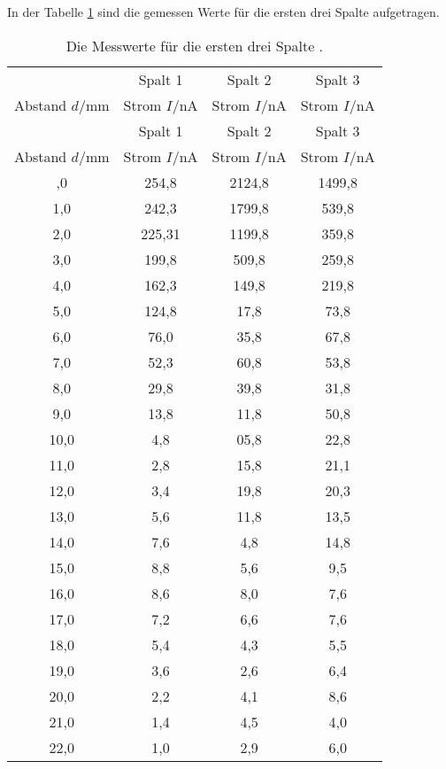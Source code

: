 In der Tabelle \ref{tab:spalt} sind die gemessen Werte
für die ersten drei Spalte aufgetragen.
\newpage
\begin{center}
\begin{longtable}{c c c c }
  \caption{Die Messwerte für die ersten drei Spalte .}
  \label{tab:spalt}\\
  \toprule
      & Spalt 1 & Spalt 2 & Spalt 3\\
  Abstand $d/\si{\milli\meter}$ & Strom $I/\si{\nano\ampere}$ & Strom $I/\si{\nano\ampere}$   & Strom $I/\si{\nano\ampere}$     \\
  \midrule
  \endfirsthead
  \toprule
  & Spalt 1 & Spalt 2 & Spalt 3\\
Abstand $d/\si{\milli\meter}$ & Strom $I/\si{\nano\ampere}$ & Strom $I/\si{\nano\ampere}$   & Strom $I/\si{\nano\ampere}$     \\
  \midrule
  \endhead
  \bottomrule
  \endfoot
  0,0 & 254,8  & 2124,8 & 1499,8\\
  1,0 & 242,3  & 1799,8 &  539,8\\
  2,0 & 225,31 & 1199,8 &  359,8\\
  3,0 & 199,8  &  509,8 &  259,8\\
  4,0 & 162,3  &  149,8 &  219,8\\
  5,0 & 124,8  &   17,8 &   73,8\\
  6,0 & 76,0   &   35,8 &   67,8\\
  7,0 & 52,3   &   60,8 &   53,8\\
  8,0 & 29,8   &   39,8 &   31,8\\
  9,0 & 13,8   &   11,8 &   50,8\\
  10,0 & 4,8   &   05,8 &   22,8\\
  11,0 & 2,8   &   15,8 &   21,1\\
  12,0 & 3,4   &   19,8 &   20,3\\
  13,0 & 5,6   &   11,8 &   13,5\\
  14,0 & 7,6   &    4,8 &   14,8\\
  15,0 & 8,8   &    5,6 &    9,5\\
  16,0 & 8,6   &    8,0 &    7,6\\
  17,0 & 7,2   &    6,6 &    7,6\\
  18,0 & 5,4   &    4,3 &    5,5\\
  19,0 & 3,6   &    2,6 &    6,4\\
  20,0 & 2,2   &    4,1 &    8,6\\
  21,0 & 1,4   &    4,5 &    4,0\\
  22,0 & 1,0   &    2,9 &    6,0\\

\end{longtable}
\end{center}
